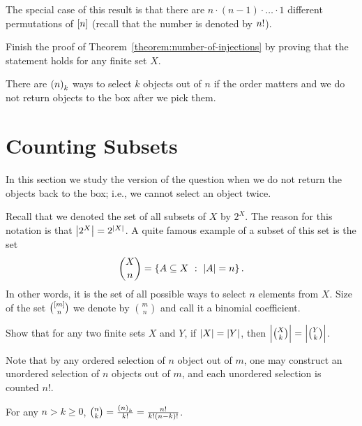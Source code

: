 The special case of this result is that there are
$n \cdot (n - 1) \cdot  \dots \cdot  1$ different
permutations of ${[{n}]}$ (recall that the number is denoted by
$\numberOfPermutations{n}$).

\begin{exercise}
  Finish the proof of Theorem~\ref{theorem:number-of-injections} by proving that
  the statement holds for any finite set $X$.
\end{exercise}

\begin{corollary}
  There are $\numberOfPermutations[k]{n}$ ways to select $k$ objects out of $n$ if the order matters
  and we do not return objects to the box after we pick them.
\end{corollary}

\section{Counting Subsets}
In this section we study the version of the question when we do not return the
objects back to the box; i.e., we cannot select an object twice.

Recall that we denoted the set of all subsets of $X$ by $2^X$. The reason for
this notation is that $\cardinality{\subsets{X}} = 2^{\cardinality{X}}$. A quite
famous example of a subset of this set is the set
\[
  \subsets[n]{X} = \set[\cardinality{A} = n]{A \subseteq X}.
\]
In other words, it is the set of all possible ways to select $n$ elements from
$X$. Size of the set $\subsets[n]{\range{m}}$ we denote by $\binom{m}{n}$ and
call it a binomial coefficient.
\begin{exercise}
  Show that for any two finite sets $X$ and $Y$, if $\left|{X}\right| =
  \left|{Y}\right|$, then
  $\cardinality{\subsets[k]{X}} = \cardinality{\subsets[k]{Y}}$.
\end{exercise}

Note that by any ordered selection of $n$ object out of $m$, one may construct
an unordered selection of $n$ objects out of $m$, and each unordered selection
is counted $n!$.
\begin{theorem}
\label{theorem:binomial-coefficients-explicit}
  For any $n > k \ge 0$,
  $\binom{n}{k} = \frac{\numberOfPermutations[k]{n}}{k!} = \frac{n!}{k!  (n - k)!}$.
\end{theorem}

